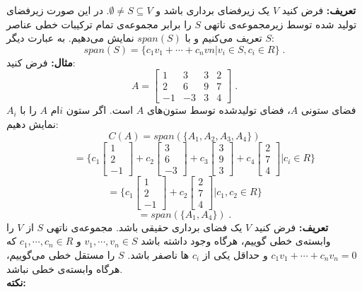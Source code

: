 \textbf{تعریف:}
فرض کنید $V$ یک زیر‌فضا‌ی برداری باشد و $\emptyset\neq S\subseteq V$. در این صورت زیر‌فضا‌ی تولید شده توسط زیر‌مجموعه‌ی ناتهی $S$ را برابر مجموعه‌ی تمام ترکیبات خطی عناصر $S$ تعریف می‌کنیم و با $span(S)$ نمایش می‌دهیم. به عبارت دیگر:
$$span(S) = \{c_{1}v_{1}+\cdots+c_{n}v{n}|v_{i}\in S, c_{i}\in R\} \; .$$
\textbf{مثال:}
فرض کنید:
$$A=\begin{bmatrix}
1&3&3&2\\
2&6&9&7\\
-1&-3&3&4
\end{bmatrix} \; .$$
فضا‌ی ستونی $A$، فضا‌ی تولید‌شده توسط ستون‌های $A$ است. اگر ستون $i$ام $A$ را با $A_{i}$ نمایش دهیم:
$$C(A) = span(\{A_{1},A_{2},A_{3},A_{4}\})$$
$$\qquad=\Bigg\{c_{1}\begin{bmatrix}
1\\2\\-1
\end{bmatrix} + c_{2}\begin{bmatrix}
3\\6\\-3
\end{bmatrix} + c_{3}\begin{bmatrix}
3\\9\\3
\end{bmatrix} + c_{4}\begin{bmatrix}
2\\7\\4
\end{bmatrix} \bigg| c_{i}\in R
\Bigg\}$$
$$=\Bigg\{c_{1}\begin{bmatrix}
1\\2\\-1
\end{bmatrix} + c_{2}\begin{bmatrix}
2\\7\\4
\end{bmatrix}
\bigg|c_{1},c_{2}\in R\Bigg\}$$
$$= span(\{A_{1},A_{4}\})  \; .$$
\textbf{تعریف:}
فرض کنید $V$ یک فضا‌ی برداری حقیقی باشد. مجموعه‌ی ناتهی $S$ از $V$ را وابسته‌ی خطی گوییم، هرگاه وجود داشته باشد $v_1,\cdots ,v_n\in S$ و $c_1,\cdots,c_n\in R$ که $c_1v_1+\cdots+c_nv_n=0$ و حداقل یکی از $c_i$ ها ناصفر باشد. $S$ را مستقل خطی می‌گوییم، هرگاه وابسته‌ی خطی نباشد.\\
\textbf{نکته:}
